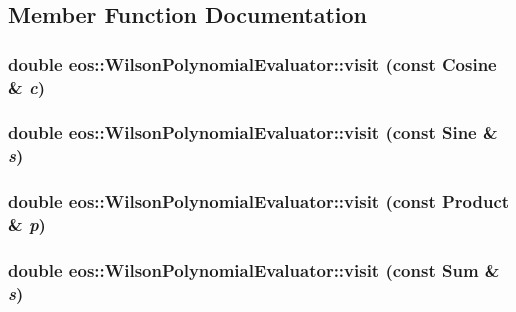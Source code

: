 \subsection{Member Function Documentation}
\hypertarget{classeos_1_1WilsonPolynomialEvaluator_aa2c20db0637cbd2ad4a4ca278e0f0dc8}{
\subsubsection[{visit}]{\setlength{\rightskip}{0pt plus 5cm}double eos::WilsonPolynomialEvaluator::visit (const Cosine \& {\em c})}}
\label{classeos_1_1WilsonPolynomialEvaluator_aa2c20db0637cbd2ad4a4ca278e0f0dc8}
\hypertarget{classeos_1_1WilsonPolynomialEvaluator_ac428812e088c1162538afa2295575254}{
\subsubsection[{visit}]{\setlength{\rightskip}{0pt plus 5cm}double eos::WilsonPolynomialEvaluator::visit (const Sine \& {\em s})}}
\label{classeos_1_1WilsonPolynomialEvaluator_ac428812e088c1162538afa2295575254}
\hypertarget{classeos_1_1WilsonPolynomialEvaluator_a4fe1a704b1c709430263aded5340edea}{
\subsubsection[{visit}]{\setlength{\rightskip}{0pt plus 5cm}double eos::WilsonPolynomialEvaluator::visit (const Product \& {\em p})}}
\label{classeos_1_1WilsonPolynomialEvaluator_a4fe1a704b1c709430263aded5340edea}
\hypertarget{classeos_1_1WilsonPolynomialEvaluator_a9c91165808b2aee3c8a0db64a99f5c7c}{
\subsubsection[{visit}]{\setlength{\rightskip}{0pt plus 5cm}double eos::WilsonPolynomialEvaluator::visit (const Sum \& {\em s})}}
